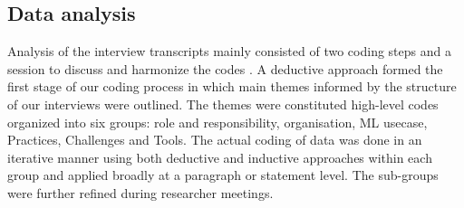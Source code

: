 

\subsection{Data analysis}
Analysis of the interview transcripts mainly consisted of two coding steps and a session to discuss and harmonize the codes \cite{Runeson2008}. A deductive approach formed the first stage of our coding process in which main themes informed by the structure of our interviews were outlined. %
The themes were constituted high-level codes organized into six groups: role and responsibility, organisation, ML usecase, Practices, Challenges and Tools. The actual coding of data was done in an iterative manner using both deductive and inductive \cite{Runeson2008} approaches within each group and applied broadly at a paragraph or statement level. The sub-groups were further refined during researcher meetings. 
